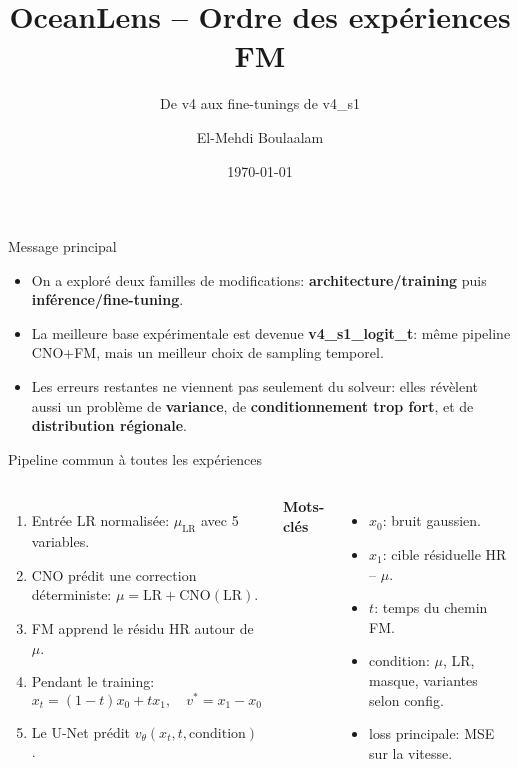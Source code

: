 \documentclass[10pt,aspectratio=169]{beamer}
\title{OceanLens -- Ordre des expériences FM}
\subtitle{De v4 aux fine-tunings de v4\_s1}
\author{El-Mehdi Boulaalam}
\date{\today}
\begin{document}
\maketitle

\begin{frame}{Message principal}
\begin{itemize}
  \item On a exploré deux familles de modifications: \textbf{architecture/training} puis \textbf{inférence/fine-tuning}.
  \item La meilleure base expérimentale est devenue \textbf{v4\_s1\_logit\_t}: même pipeline CNO+FM, mais un meilleur choix de sampling temporel.
  \item Les erreurs restantes ne viennent pas seulement du solveur: elles révèlent aussi un problème de \textbf{variance}, de \textbf{conditionnement trop fort}, et de \textbf{distribution régionale}.
\end{itemize}
\end{frame}

\begin{frame}{Pipeline commun à toutes les expériences}
\begin{columns}[T,onlytextwidth]
\begin{enumerate}
  \item Entrée LR normalisée: $\mu_{\mathrm{LR}}$ avec 5 variables.
  \item CNO prédit une correction déterministe: $\mu = \mathrm{LR} + \mathrm{CNO}(\mathrm{LR})$.
  \item FM apprend le résidu HR autour de $\mu$.
  \item Pendant le training:
  \[
    x_t = (1-t)x_0 + tx_1,\quad v^* = x_1 - x_0
  \]
  \item Le U-Net prédit $v_\theta(x_t,t,\mathrm{condition})$.
\end{enumerate}
\textbf{Mots-clés}
\begin{itemize}
  \item $x_0$: bruit gaussien.
  \item $x_1$: cible résiduelle HR -- $\mu$.
  \item $t$: temps du chemin FM.
  \item condition: $\mu$, LR, masque, variantes selon config.
  \item loss principale: MSE sur la vitesse.
\end{itemize}
\end{columns}
\end{frame}
\end{document}
